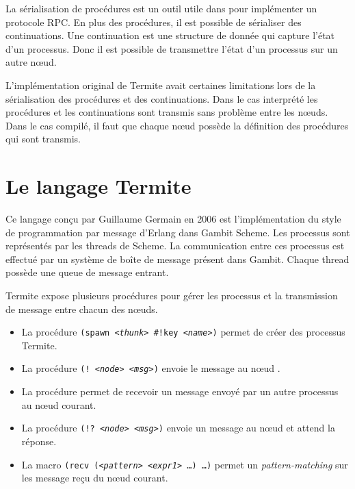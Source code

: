 La sérialisation de procédures est un outil utile dans pour implémenter
un protocole RPC. En plus des procédures, il est possible de sérialiser
des continuations. Une continuation est une structure de donnée qui capture
l'état d'un processus. Donc il est possible de transmettre l'état d'un
processus sur un autre nœud.

L'implémentation original de Termite avait certaines limitations
lors de la sérialisation des procédures et des continuations. Dans
le cas interprété les procédures et les continuations sont transmis
sans problème entre les nœuds. Dans le cas compilé, il faut que
chaque nœud possède la définition des procédures qui sont transmis.


\section{Le langage Termite}

Ce langage conçu par Guillaume Germain en 2006 est l'implémentation
du style de programmation par message d'Erlang dans Gambit Scheme.
Les processus sont représentés par les threads de Scheme. La communication
entre ces processus est effectué par un système de boîte de message
présent dans Gambit. Chaque thread possède une queue de message entrant.

Termite expose plusieurs procédures pour gérer les processus et la transmission
de message entre chacun des nœuds.

\begin{itemize}
  \item La procédure \texttt{(spawn \textit{<thunk>} \#!key \textit{<name>})} permet de
    créer des processus Termite.

  \item La procédure \texttt{(! \textit{<node>} \textit{<msg>})} envoie le message
     au nœud .

  \item La procédure  permet de recevoir un message
    envoyé par un autre processus au nœud courant.

  \item La procédure \texttt{(!? \textit{<node>} \textit{<msg>})} envoie un message au
    nœud  et attend la réponse.

  \item La macro \texttt{(recv (\textit{<pattern>} \textit{<expr1>} \dots) \dots)}
    permet un \textit{pattern-matching} sur les message reçu du nœud courant.

\end{itemize}

